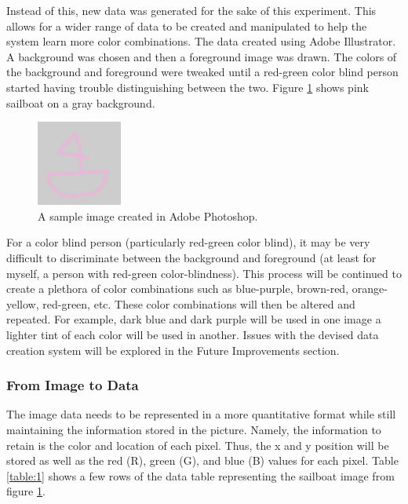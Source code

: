 \documentclass[12pt]{article}
\begin{document}
\begin{multicols}{2}
Instead of this, new data was generated for the sake of this experiment. This allows for a wider range of data to be created and manipulated to help the system learn more color combinations. The data created using Adobe Illustrator. A background was chosen and then a foreground image was drawn. The colors of the background and foreground were tweaked until a red-green color blind person started having trouble distinguishing between the two. Figure \ref{fig:data1} shows pink sailboat on a gray background.

\begin{figure}[H]
	\centering
	\includegraphics[width=0.25\textwidth]{img/data2.png}
	\caption{A sample image created in Adobe Photoshop.}
	\label{fig:data1}
\end{figure}

For a color blind person (particularly red-green color blind), it may be very difficult to discriminate between the background and foreground (at least for myself, a person with red-green color-blindness). This process will be continued to create a plethora of color combinations such as blue-purple, brown-red, orange-yellow, red-green, etc. These color combinations will then be altered and repeated. For example, dark blue and dark purple will be used in one image a lighter tint of each color will be used in another. Issues with the devised data creation system will be explored in the Future Improvements section.

\subsubsection{From Image to Data}
The image data needs to be represented in a more quantitative format while still maintaining the information stored in the picture. Namely, the information to retain is the color and location of each pixel. Thus, the x and y position will be stored as well as the red (R), green (G), and blue (B) values for each pixel. Table \ref{table:1} shows a few rows of the data table representing the sailboat image from figure \ref{fig:data1}. 


\end{multicols}
\end{document}
